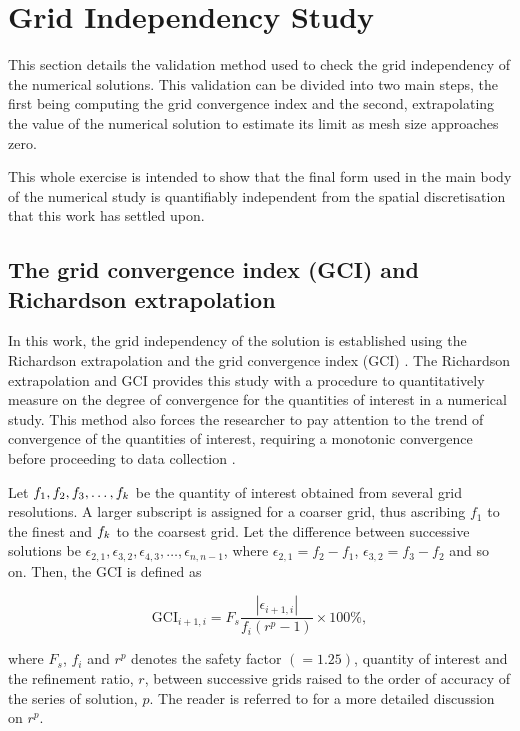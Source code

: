 \documentclass[oneside]{utmthesis}
\begin{document}
\section{Grid Independency Study} \label{sec:gridIndStu}

This section details the validation method used to check the grid independency of the numerical solutions. This validation can be divided into two main steps, the first being computing the grid convergence index and the second, extrapolating the value of the numerical solution to estimate its limit as mesh size approaches zero.

This whole exercise is intended to show that the final form used in the main body of the numerical study is quantifiably independent from the spatial discretisation that this work has settled upon.

\subsection{The grid convergence index (GCI) and Richardson extrapolation} \label{ssec:richExtrap}
In this work, the grid independency of the solution is established using the Richardson extrapolation and the grid convergence index (GCI) \citep{Richardson1927,Stern2001}. The Richardson extrapolation and GCI provides this study with a procedure to quantitatively measure on the degree of convergence for the quantities of interest in a numerical study. This method also forces the researcher to pay attention to the trend of convergence of the quantities of interest, requiring a monotonic convergence before proceeding to data collection \citep{Stern2001,MatAli2011,Maruai2018}.

Let $f_{1},f_{2},f_{3},\dots,f_{k}$ be the quantity of interest obtained from several grid resolutions. A larger subscript is assigned for a coarser grid, thus ascribing $f_{1}$ to the finest and $f_{k}$ to the coarsest grid. Let the difference between successive solutions be $\epsilon_{2,1},\epsilon_{3,2},\epsilon_{4,3},\dots,\epsilon_{n,n-1}$, where $\epsilon_{2,1} = f_{2} - f_{1}$, $\epsilon_{3,2} = f_{3} - f_{2}$ and so on. Then, the GCI is defined as

\begin{equation}
  \text{GCI}_{i+1,i} = F_{s} \frac{\left |\epsilon_{i+1,i} \right |}{f_{i} \left ( r^{p} - 1 \right )} \times 100\%,
  \label{eq:gci}
\end{equation}

\noindent where $F_{s}$, $f_{i}$ and $r^{p}$ denotes the safety factor $\left ( = 1.25 \right )$, quantity of interest and the refinement ratio, $r$, between successive grids raised to the order of accuracy of the series of solution, $p$. The reader is referred to \citet{Stern2001,Langley2018} for a more detailed discussion on $r^{p}$.
\end{document}
